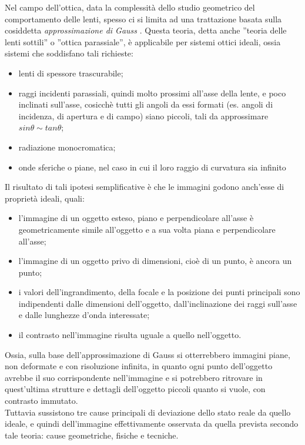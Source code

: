 Nel campo dell'ottica, data la complessità dello studio geometrico del comportamento delle lenti, spesso ci si limita ad una trattazione basata sulla cosiddetta \textit{approssimazione di Gauss} \cite{difetti}. Questa teoria, detta anche ''teoria delle lenti sottili'' o ''ottica parassiale'', è applicabile per sistemi ottici ideali, ossia sistemi che soddisfano tali richieste:

\begin{itemize}
\item lenti di spessore trascurabile;
\item raggi incidenti parassiali, quindi molto prossimi all'asse della lente, e poco inclinati sull'asse, cosicchè tutti gli angoli da essi formati (es. angoli di incidenza, di apertura e di campo) siano piccoli, tali da approssimare $sin\theta \sim tan\theta$;
\item radiazione monocromatica;
\item onde sferiche o piane, nel caso in cui il loro raggio di curvatura  sia infinito
\end{itemize}

Il risultato di tali ipotesi semplificative è che le immagini godono anch'esse di proprietà ideali, quali:

\begin{itemize}
\item l'immagine di un oggetto esteso, piano e perpendicolare all'asse è geometricamente simile all'oggetto e a sua volta piana e perpendicolare all'asse;
\item l'immagine di un oggetto privo di dimensioni, cioè di un punto, è ancora un punto;
\item i valori dell'ingrandimento, della focale e la posizione dei punti principali sono indipendenti dalle dimensioni dell'oggetto, dall'inclinazione dei raggi sull'asse e dalle lunghezze d'onda interessate;
\item il contrasto nell'immagine risulta uguale a quello nell'oggetto.
\end{itemize}

Ossia, sulla base dell'approssimazione di Gauss si otterrebbero immagini piane, non deformate e con risoluzione infinita, in quanto ogni punto dell'oggetto avrebbe il suo corrispondente nell'immagine e si potrebbero ritrovare in quest'ultima strutture e dettagli dell'oggetto piccoli quanto si vuole, con contrasto immutato.\\
Tuttavia sussistono tre cause principali di deviazione dello stato reale da quello ideale, e quindi dell'immagine effettivamente osservata da quella prevista secondo tale teoria: cause geometriche, fisiche e tecniche.


